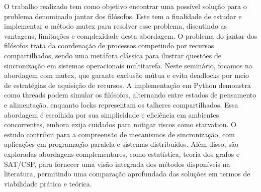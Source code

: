 O trabalho realizado tem como objetivo encontrar uma possível solução para o problema denominado jantar dos filósofos. Este tem a finalidade de estudar e implementar o método mutex para resolver esse problema, discutindo as vantagens, limitações e complexidade desta abordagem. O problema do jantar dos filósofos trata da coordenação de processos competindo por recursos compartilhados, sendo uma metáfora clássica para ilustrar questões de sincronização em sistemas operacionais multitarefa. Neste seminário, focamos na abordagem com mutex, que garante exclusão mútua e evita deadlocks por meio de estratégias de aquisição de recursos. A implementação em Python demonstra como threads podem simular os filósofos, alternando entre estados de pensamento e alimentação, enquanto locks representam os talheres compartilhados. Essa abordagem é escolhida por sua simplicidade e eficiência em ambientes concorrentes, embora exija cuidados para mitigar riscos como starvation. O estudo contribui para a compreensão de mecanismos de sincronização, com aplicações em programação paralela e sistemas distribuídos. Além disso, são exploradas abordagens complementares, como estatística, teoria dos grafos e SAT/CSP, para fornecer uma visão integrada dos métodos disponíveis na literatura, permitindo uma comparação aprofundada das soluções em termos de viabilidade prática e teórica.
